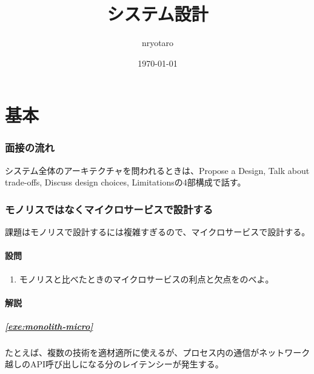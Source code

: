 \documentclass{jlreq}
\begin{document}
\title{システム設計}
\author{nryotaro}
\date{\today}
\maketitle
\tableofcontents
\part{基本}
\section{面接の流れ}
\begin{refsection}
  システム全体のアーキテクチャを問われるときは、Propose a Design, Talk about trade-offs, Discuss design choices, Limitationsの4部構成で話す\cite{lc-high}。
  \printjbibliography
\end{refsection}
\section{モノリスではなくマイクロサービスで設計する}
\begin{refsection}
  課題はモノリスで設計するには複雑すぎるので、マイクロサービスで設計する\cite{lc-aa}。
  \subsection{設問}
  \begin{enumerate}[label=問題\arabic*,labelsep=10pt,leftmargin=*]
  \item モノリスと比べたときのマイクロサービスの利点と欠点をのべよ。\label{exe:monolith-micro}
  \end{enumerate}
  \subsection{解説}
  \subsubsection*{\ref{exe:monolith-micro}}
  たとえば、複数の技術を適材適所に使えるが、プロセス内の通信がネットワーク越しのAPI呼び出しになる分のレイテンシーが発生する\cite{lc-aa}。
  \printjbibliography
\end{refsection}
\end{document}
